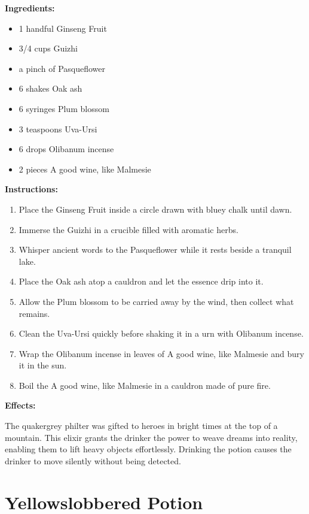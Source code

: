 \documentclass{article}
\begin{document}
\textbf{Ingredients:}

\begin{itemize}
  \item 1 handful Ginseng Fruit
  \item 3/4 cups Guizhi
  \item a pinch of Pasqueflower
  \item 6 shakes Oak ash
  \item 6 syringes Plum blossom
  \item 3 teaspoons Uva-Ursi
  \item 6 drops Olibanum incense
  \item 2 pieces A good wine, like Malmesie
\end{itemize}

\textbf{Instructions:}

\begin{enumerate}
  \item Place the Ginseng Fruit inside a circle drawn with bluey chalk until dawn.
  \item Immerse the Guizhi in a crucible filled with aromatic herbs.
  \item Whisper ancient words to the Pasqueflower while it rests beside a tranquil lake.
  \item Place the Oak ash atop a cauldron and let the essence drip into it.
  \item Allow the Plum blossom to be carried away by the wind, then collect what remains.
  \item Clean the Uva-Ursi quickly before shaking it in a urn with Olibanum incense.
  \item Wrap the Olibanum incense in leaves of A good wine, like Malmesie and bury it in the sun.
  \item Boil the A good wine, like Malmesie in a cauldron made of pure fire.
\end{enumerate}

\textbf{Effects:}

The quakergrey philter was gifted to heroes in bright times at the top of a mountain. This elixir grants the drinker the power to weave dreams into reality, enabling them to lift heavy objects effortlessly. Drinking the potion causes the drinker to move silently without being detected.

\newpage
\section*{Yellowslobbered Potion}
\end{document}
